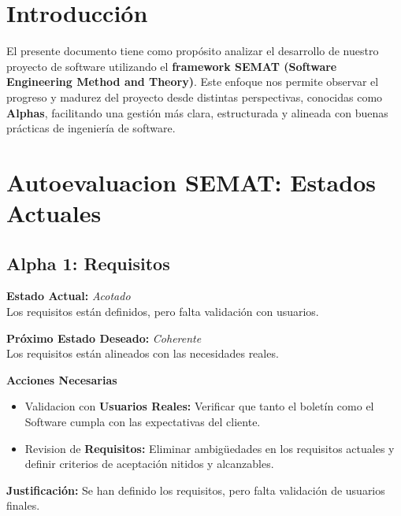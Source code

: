 \documentclass[12pt]{article}
\begin{document}
\vspace{1cm}

\section{Introducción}

El presente documento tiene como propósito analizar 
el desarrollo de nuestro proyecto de software utilizando 
el \textbf{framework SEMAT (Software Engineering Method 
and Theory)}. Este enfoque nos permite observar el 
progreso y madurez del proyecto desde distintas 
perspectivas, conocidas como \textbf{Alphas}, facilitando una 
gestión más clara, estructurada y alineada con buenas 
prácticas de ingeniería de software.


\section{Autoevaluacion SEMAT: Estados Actuales}


\subsection{Alpha 1: Requisitos}


\textbf{Estado Actual:} \textit{Acotado} \\
\hspace*{1cm} Los requisitos están definidos, pero falta validación con usuarios.

\textbf{Próximo Estado Deseado:} \textit{Coherente} \\
\hspace*{1cm} Los requisitos están alineados con las necesidades reales.


\vspace{0.1cm}

\textbf{Acciones Necesarias}
\begin{itemize}
    \item Validacion con \textbf{Usuarios Reales:} Verificar que tanto 
    el boletín como el Software cumpla con las expectativas del cliente.
    \item Revision de \textbf{Requisitos:} Eliminar ambigüedades en los 
    requisitos actuales y definir criterios de aceptación nitidos y alcanzables.
\end{itemize}

\vspace{0.1cm}

\textbf{Justificación:} Se han definido los requisitos, pero falta validación de usuarios finales.
\end{document}
